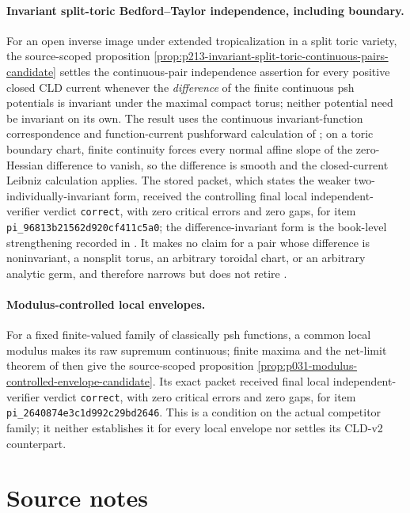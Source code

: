 \paragraph{Invariant split-toric Bedford--Taylor independence, including boundary.}
For an open inverse image under extended tropicalization in a split toric
variety, the source-scoped
proposition \cref{prop:p213-invariant-split-toric-continuous-pairs-candidate}
settles the continuous-pair independence assertion for every positive closed
CLD current whenever the \emph{difference} of the finite continuous psh
potentials is invariant under the maximal compact torus; neither potential
need be invariant on its own.  The result uses the continuous invariant-function
correspondence and function-current pushforward calculation of
\cite[(5.5) and Proposition~5.3.10(iv)]{BGJKK25}; on a toric boundary chart,
finite continuity forces every normal affine slope of the zero-Hessian
difference to vanish, so the difference is smooth and the closed-current
Leibniz calculation applies.  The stored packet, which states the weaker
two-individually-invariant form, received the controlling final local
independent-verifier verdict \texttt{correct}, with zero critical errors and
zero gaps, for item \texttt{pi\_96813b21562d920cf411c5a0}; the
difference-invariant form is the book-level strengthening recorded in
.  It makes no claim for a pair whose
difference is noninvariant, a nonsplit torus, an arbitrary toroidal chart, or
an arbitrary analytic germ, and therefore narrows but does not retire
.

\paragraph{Modulus-controlled local envelopes.}
For a fixed finite-valued family of classically psh functions, a common local
modulus makes its raw supremum continuous; finite maxima and the net-limit
theorem of \cite[Proposition~4.2(3) and Theorem~6.5]{GR25Classical} then give
the source-scoped proposition
\cref{prop:p031-modulus-controlled-envelope-candidate}.  Its exact packet
received final local independent-verifier verdict \texttt{correct}, with zero
critical errors and zero gaps, for item
\texttt{pi\_2640874e3c1d992c29bd2646}.  This is a condition on the actual
competitor family; it neither establishes it for every local envelope nor
settles its CLD-v2 counterpart.

\section*{Source notes}
\label{sec:verified-source-notes}

